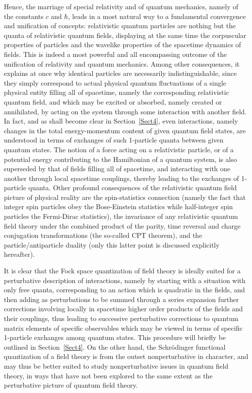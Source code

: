 \documentclass[a4paper,11pt]{article}
\begin{document}
\vspace{5pt}

Hence, the marriage of special relativity and of quantum me\-cha\-nics, 
namely of the constants $c$ and $\hbar$, leads in a most natural way
to a fundamental convergence and unification of concepts: relativistic 
quantum particles
are nothing but the quanta of relativistic quantum fields, displaying
at the same time the corpuscular properties of particles and the
wavelike properties of the spacetime dynamics of fields. This is indeed
a most powerful and all encompassing outcome of the unification of
relativity and quantum me\-cha\-nics. Among other consequences, it explains
at once why identical particles are necessarily indistinguishable,
since they simply correspond to actual physical quantum fluctuations
of a single physical entity filling all of spacetime, namely the
corresponding relativistic quantum field, and which may be excited or
absorbed, namely created or annihilated, by acting on the system
through some interaction with another field. In fact, and as shall
become clear in Section~\ref{Sect4}, even interactions, namely changes
in the total energy-momentum content of given quantum field states,
are understood in terms of exchanges of such 1-particle quanta between
given quantum states. The notion of a force acting on a re\-la\-ti\-vistic
particle, or of a potential energy contributing to the Hamiltonian
of a quantum system, is also superseded by that of fields filling all
of spacetime, and interacting with one another through local spacetime
couplings, thereby leading to the exchanges of 1-particle quanta.
Other profound consequences of the relativistic quantum field picture
of physical reality are the spin-statistics connection (namely the fact
that integer spin particles obey the Bose-Einstein statistics while
half-integer spin particles the Fermi-Dirac statistics), the invariance
of any relativistic quantum field theory under the combined product of
the parity, time reversal and charge conjugation transformations (the 
so-called CPT theorem), and the particle/antiparticle duality (only this 
latter point is discussed explicitly hereafter).

It is clear that the Fock space quantization of field theory is
ideally suited for a perturbative description of interactions, namely
by starting with a situation with only free quanta, corresponding to
an action which is quadratic in the fields, and then adding as
perturbations to be summed through a series expansion
further corrections involving locally in spacetime higher order
pro\-ducts of the fields and their couplings, thus leading to
successive perturbative corrections to quantum matrix elements of specific
observables which may be viewed in terms of specific 1-particle exchanges
among quantum states. This procedure will briefly be outlined in 
Section~\ref{Sect4}. On the other hand, the Schr\"odinger functional 
quantization of a field theory is from the outset nonperturbative in 
character, and may thus be better suited to study nonperturbative issues 
in quantum field theory, in ways that have not been explored to the same 
extent as the perturbative picture of quantum field theory.
\end{document}
